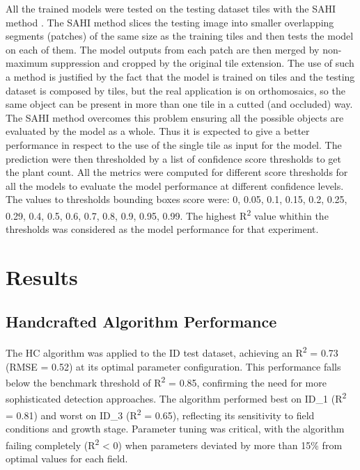 \documentclass{article}
\begin{document}
All the trained models were tested on the testing dataset tiles with the SAHI method \cite{akyonSlicingAidedHyper2022}.
The SAHI method slices the testing image into smaller overlapping segments (patches) 
of the same size as the training tiles and then tests the model on each of them. 
The model outputs from each patch are then merged by non-maximum suppression and 
cropped by the original tile extension.
The use of such a method is justified by the fact that the model is trained on tiles and
the testing dataset is composed by tiles, but the real application is on orthomosaics, so
the same object can be present in more than one tile in a cutted (and occluded) way.
The SAHI method overcomes this problem ensuring all the possible objects are evaluated by the
model as a whole. Thus it is expected to give a better performance in respect to the use of the
single tile as input for the model.
The prediction were then thresholded by a list of confidence score thresholds to get the plant count.
All the metrics were computed for different score thresholds for all the models
to evaluate the model performance at different confidence levels.
The values to thresholds bounding boxes score were: 0, 0.05, 0.1, 0.15, 0.2, 0.25, 0.29, 0.4, 0.5, 0.6, 0.7, 0.8, 0.9, 0.95, 0.99.
The highest R\textsuperscript{2} value whithin the thresholds was considered as the model 
performance for that experiment.

\section{Results}

\subsection{Handcrafted Algorithm Performance}

The HC algorithm was applied to the ID test dataset, achieving an R\textsuperscript{2} = 0.73 (RMSE = 0.52) at its optimal parameter configuration. This performance falls below the benchmark threshold of R\textsuperscript{2} = 0.85, confirming the need for more sophisticated detection approaches. The algorithm performed best on ID_1 (R\textsuperscript{2} = 0.81) and worst on ID_3 (R\textsuperscript{2} = 0.65), reflecting its sensitivity to field conditions and growth stage. Parameter tuning was critical, with the algorithm failing completely (R\textsuperscript{2} < 0) when parameters deviated by more than 15\% from optimal values for each field.
\end{document}
